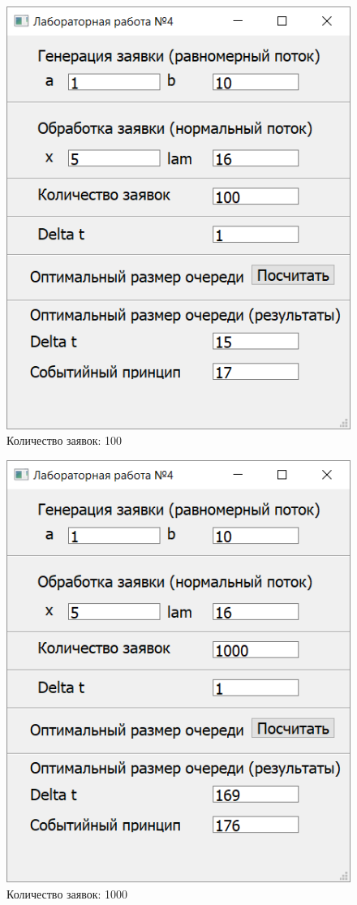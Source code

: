 \begin{figure}[h]
	\centering
	\includegraphics[width=0.7\linewidth]{src/resutl_100}
	\caption{Количество заявок: 100}
	\label{fig:resutl100}
\end{figure}

\begin{figure}
	\centering
	\includegraphics[width=0.7\linewidth]{src/result_1000}
	\caption{Количество заявок: 1000}
	\label{fig:result1000}
\end{figure}

